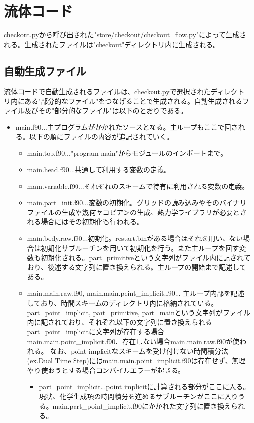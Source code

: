 \documentclass{jsarticle}
\begin{document}
\section{流体コード}%
checkout.pyから呼び出された"store/checkout/checkout\_flow.py"によって生成される。生成されたファイルは"checkout"ディレクトリ内に生成される。
\subsection{自動生成ファイル}%
流体コードで自動生成されるファイルは、checkout.pyで選択されたディレクトリ内にある"部分的なファイル"をつなげることで生成される。自動生成されるファイル及びその"部分的なファイル"は以下のとおりである。
\begin{itemize}
\item main.f90...主プログラムがかかれたソースとなる。主ループもここで回される。以下の順にファイルの内容が追記されていく。
\begin{itemize}
\item main.top.f90..."program main"からモジュールのインポートまで。
\item main.head.f90...共通して利用する変数の定義。
\item main.variable.f90...それぞれのスキームで特有に利用される変数の定義。
\item main.part\_init.f90...変数の初期化。グリッドの読み込みやそのバイナリファイルの生成や幾何ヤコビアンの生成、熱力学ライブラリが必要とされる場合にはその初期化も行われる。
\item main.body.raw.f90...初期化。restart.binがある場合はそれを用い、ない場合は初期化サブルーチンを用いて初期化を行う。また主ループを回す変数も初期化される。part\_primitiveという文字列がファイル内に記されており、後述する文字列に置き換えられる。主ループの開始まで記述してある。
\item main.main.raw.f90, main.main.point\_implicit.f90...
主ループ内部を記述しており、時間スキームのディレクトリ内に格納されている。
part\_point\_implicit, part\_primitive, part\_mainという文字列がファイル内に記されており、それぞれ以下の文字列に置き換えられる
part\_point\_implicitに文字列が存在する場合main.main.point\_implicit.f90、存在しない場合main.main.raw.f90が使われる。
なお、point implicitなスキームを受け付けない時間積分法(ex.Dual Time Step)にはmain.main.point\_implicit.f90は存在せず、無理やり使おうとする場合コンパイルエラーが起きる。
\begin{itemize}
\item part\_point\_implicit...point implicitに計算される部分がここに入る。現状、化学生成項の時間積分を進めるサブルーチンがここに入りうる。main.part\_point\_implicit.f90にかかれた文字列に置き換えられる。

\end{itemize}
\end{itemize}
\end{itemize}
\end{document}
